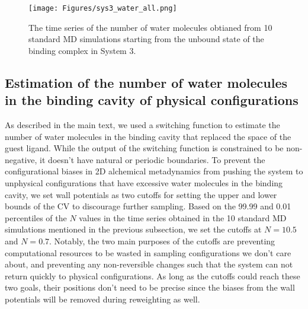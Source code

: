 \documentclass[journal=jacsat,manuscript=article]{achemso}
\begin{document}
\begin{figure}[H]
    \centering
    \texttt{[image: Figures/sys3\_water\_all.png]} 
    \caption{The time series of the number of water molecules obtianed from 10 standard MD simulations starting from the unbound state of the binding complex in System 3. }
    \label{sys3_water_all}
\end{figure}

\subsection{Estimation of the number of water molecules in the binding cavity of physical configurations}
As described in the main text, we used a switching function to estimate the number of water molecules in the binding cavity that replaced the space of the guest ligand. While the output of the switching function is constrained to be non-negative, it doesn't have natural or periodic boundaries. To prevent the configurational biases in 2D alchemical metadynamics from pushing the system to unphysical configurations that have excessive water molecules in the binding cavity, we set wall potentials as two cutoffs for setting the upper and lower bounds of the CV to discourage further sampling. Based on the 99.99 and 0.01 percentiles of the $N$ values in the time series obtained in the 10 standard MD simulations mentioned in the previous subsection, we set the cutoffs at $N=10.5$ and $N=0.7$. Notably, the two main purposes of the cutoffs are preventing computational resources to be wasted in sampling configurations we don't care about, and preventing any non-reversible changes such that the system can not return quickly to physical configurations. As long as the cutoffs could reach these two goals, their positions don't need to be precise since the biases from the wall potentials will be removed during reweighting as well.

\end{document}
